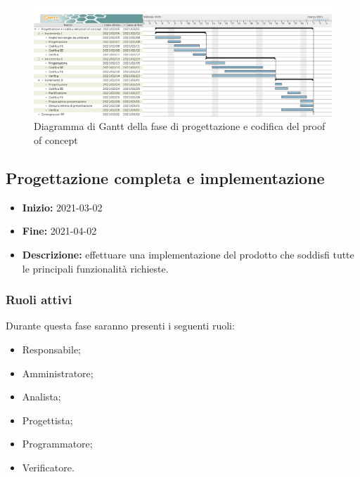 \begin{figure}[H]
    \centering
    \includegraphics[width=1\linewidth]{res/images/pianificazione/progettazione_e_codifica_del_proof_of_concept.png}
    \caption{Diagramma di Gantt della fase di progettazione e codifica del proof of concept}
    \label{fig:_Gantt progettazione e codifica del proof of concept}
\end{figure}



\subsection{Progettazione completa e implementazione} \label{_pianificazioneProgettazioneCompletaImplementazione}
\begin{itemize}
    \item []\textbf{Inizio:} 2021-03-02
    \item []\textbf{Fine:} 2021-04-02
    \item []\textbf{Descrizione:} effettuare una implementazione del prodotto che soddisfi tutte le principali funzionalità richieste.
\end{itemize}

\subsubsection{Ruoli attivi}
Durante questa fase saranno presenti i seguenti ruoli:
\begin{itemize}
    \item Responsabile;
    \item Amministratore;
    \item Analista;
    \item Progettista;
    \item Programmatore;
    \item Verificatore.
\end{itemize}

